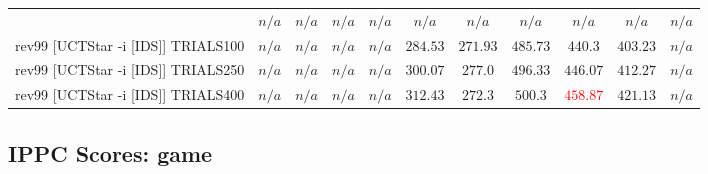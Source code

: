\documentclass{article}
\begin{document}
\begin{tabular}{|l|r@{$\pm$}rr@{$\pm$}rr@{$\pm$}rr@{$\pm$}rr@{$\pm$}rr@{$\pm$}rr@{$\pm$}rr@{$\pm$}rr@{$\pm$}rr@{$\pm$}r|}
& \multicolumn{2}{c}{\textbf{$n/a$}}
& \multicolumn{2}{c}{\textbf{$n/a$}}
& \multicolumn{2}{c}{\textbf{$n/a$}}
& \multicolumn{2}{c}{\textbf{$n/a$}}
& \multicolumn{2}{c}{\textbf{$n/a$}}
& \multicolumn{2}{c}{\textbf{$n/a$}}
& \multicolumn{2}{c}{\textbf{$n/a$}}
& \multicolumn{2}{c}{\textbf{$n/a$}}
& \multicolumn{2}{c}{\textbf{$n/a$}}
& \multicolumn{2}{c|}{\textbf{$n/a$}}
\\
rev99 [UCTStar -i [IDS]] TRIALS100
& \multicolumn{2}{c}{\textbf{$n/a$}}
& \multicolumn{2}{c}{\textbf{$n/a$}}
& \multicolumn{2}{c}{\textbf{$n/a$}}
& \multicolumn{2}{c}{\textbf{$n/a$}}
& \multicolumn{2}{c}{$284.53$}
& \multicolumn{2}{c}{$271.93$}
& \multicolumn{2}{c}{$485.73$}
& \multicolumn{2}{c}{$440.3$}
& \multicolumn{2}{c}{$403.23$}
& \multicolumn{2}{c|}{\textbf{$n/a$}}
\\
rev99 [UCTStar -i [IDS]] TRIALS250
& \multicolumn{2}{c}{\textbf{$n/a$}}
& \multicolumn{2}{c}{\textbf{$n/a$}}
& \multicolumn{2}{c}{\textbf{$n/a$}}
& \multicolumn{2}{c}{\textbf{$n/a$}}
& \multicolumn{2}{c}{$300.07$}
& \multicolumn{2}{c}{$277.0$}
& \multicolumn{2}{c}{\textbf{$496.33$}}
& \multicolumn{2}{c}{$446.07$}
& \multicolumn{2}{c}{$412.27$}
& \multicolumn{2}{c|}{\textbf{$n/a$}}
\\
rev99 [UCTStar -i [IDS]] TRIALS400
& \multicolumn{2}{c}{\textbf{$n/a$}}
& \multicolumn{2}{c}{\textbf{$n/a$}}
& \multicolumn{2}{c}{\textbf{$n/a$}}
& \multicolumn{2}{c}{\textbf{$n/a$}}
& \multicolumn{2}{c}{\textbf{$312.43$}}
& \multicolumn{2}{c}{$272.3$}
& \multicolumn{2}{c}{\textbf{$500.3$}}
& \multicolumn{2}{c}{\textbf{\textcolor{red}{$458.87$}}}
& \multicolumn{2}{c}{\textbf{$421.13$}}
& \multicolumn{2}{c|}{\textbf{$n/a$}}
\\
\hline
\end{tabular}%

\bigskip

\subsection*{IPPC Scores: game}
\end{document}
